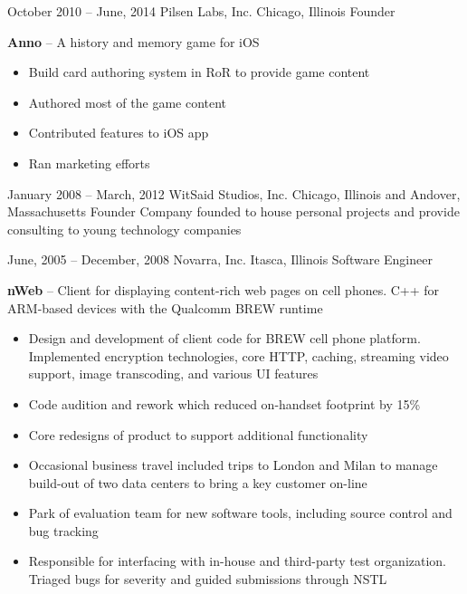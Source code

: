 \documentclass[]{friggeri-cv}
\begin{document}
\begin{entrylist}
    \entryalt
    {October 2010 -- June, 2014}
    {Pilsen Labs, Inc.}
    {Chicago, Illinois}
    {Founder}
    {\textbf{Anno} -- A history and memory game for iOS
    \begin{itemize}
      \item Build card authoring system in RoR to provide game content
      \item Authored most of the game content
      \item Contributed features to iOS app
      \item Ran marketing efforts
    \end{itemize}}

    \entryalt
    {January 2008 -- March, 2012}
    {WitSaid Studios, Inc.}
    {Chicago, Illinois and Andover, Massachusetts}
    {Founder}
    {Company founded to house personal projects and provide consulting to young technology companies}

    \entryalt
    {June, 2005 -- December, 2008}
    {Novarra, Inc.}
    {Itasca, Illinois}
    {Software Engineer}
    {\textbf{nWeb} -- Client for displaying content-rich web pages on cell phones. C++ for ARM-based devices with the Qualcomm BREW runtime
    \begin{itemize}
      \item Design and development of client code for BREW cell phone platform. Implemented encryption technologies, core HTTP, caching, streaming video support, image transcoding, and various UI features
      \item Code audition and rework which reduced on-handset footprint by 15\%
      \item Core redesigns of product to support additional functionality
      \item Occasional business travel included trips to London and Milan to manage build-out of two data centers to bring a key customer on-line
      \item Park of evaluation team for new software tools, including source control and bug tracking
      \item Responsible for interfacing with in-house and third-party test organization. Triaged bugs for severity and guided submissions through NSTL
     \end{itemize}}
     

\end{entrylist}
\end{document}
